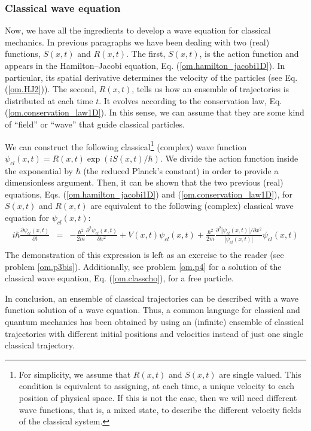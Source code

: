 \documentclass[nofootinbib, secnumarabic, amsmath, nobibnotes,11pt,aps,pra, floatfix]{revtex4-1}
\newcommand{\eref}[1]{Eq. (\ref{#1})}
\begin{document}
\subsubsection{Classical wave equation}

Now, we have all the ingredients to develop a wave equation for classical mechanics. In previous paragraphs we have been dealing with two (real) functions, $S(x,t)$ and $R(x,t)$. The first, $S(x,t)$, is the action function and appears in the Hamilton--Jacobi equation, \eref{om.hamilton_jacobi1D}. In particular, its spatial derivative determines the velocity of the particles (see \eref{om.HJ2}). The second, $R(x,t)$, tells us how an ensemble of trajectories is distributed at each time $t$. It evolves according to the conservation law, \eref{om.conservation_law1D}. In this sense, we can assume that they are some kind of ``field'' or ``wave'' that guide classical particles.

We can construct the following classical\footnote{For simplicity, we assume that $R(x,t)$ and $S(x,t)$ are single valued. This condition is equivalent to assigning, at each time, a unique velocity to each position of physical space. If this is not the case, then we will need different wave functions, that is, a mixed state, to describe the different velocity fields of the classical system.} (complex) wave function $\psi_{cl}(x,t) = R(x,t) \exp(i S(x,t)/\hbar)$.
We divide the action function inside the exponential by $\hbar$ (the reduced Planck's constant) in order to provide a dimensionless argument.
Then, it can be shown that the two previous (real) equations, Eqs. (\ref{om.hamilton_jacobi1D}) and (\ref{om.conservation_law1D}), for $S(x,t)$ and $R(x,t)$ are equivalent to the following (complex) classical wave equation for $\psi_{cl}(x,t)$:
\begin{eqnarray}
\label{om.classcho}
i \hbar \frac{ \partial \psi_{cl}(x,t)} {\partial t} &=& -\frac {\hbar^2}{2m} \frac{ {\partial}^2 \psi_{cl}(x,t)} {\partial x^2} + V(x,t) \psi_{cl}(x,t)+ \frac {\hbar^{2}} {2 m} \frac { {\partial}^2 |\psi_{cl}(x,t)|/ \partial x^2}{|\psi_{cl}(x,t)|} \psi_{cl}(x,t)\nonumber\\
\end{eqnarray}
The demonstration of this expression is left as an exercise to the
reader (see problem \ref{om.p3bis}). Additionally, see problem
\ref{om.p4} for a solution of the classical wave equation,
\eref{om.classcho}, for a free particle.

In conclusion, an ensemble of classical trajectories can be described with a wave function solution of a wave equation.
Thus, a common language for classical and quantum mechanics has been obtained by using an (infinite) ensemble of classical trajectories with different initial positions and velocities instead of just one single classical trajectory.
\end{document}

